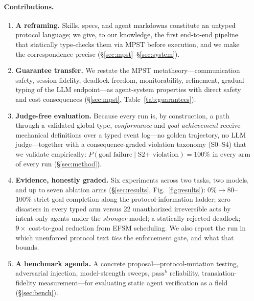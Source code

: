 \documentclass{article}
\begin{document}
\paragraph{Contributions.}
\begin{enumerate}\itemsep2pt
\item \textbf{A reframing.} Skills, specs, and agent markdowns constitute an untyped protocol language; we give, to our knowledge, the first end-to-end pipeline that statically type-checks them via MPST before execution, and we make the correspondence precise (\S\ref{sec:mpst}--\S\ref{sec:system}).
\item \textbf{Guarantee transfer.} We restate the MPST metatheory---communication safety, session fidelity, deadlock-freedom, monitorability, refinement, gradual typing of the LLM endpoint---as agent-system properties with direct safety and cost consequences (\S\ref{sec:mpst}, Table~\ref{tab:guarantees}).
\item \textbf{Judge-free evaluation.} Because every run is, by construction, a path through a validated global type, \emph{conformance} and \emph{goal achievement} receive mechanical definitions over a typed event log---no golden trajectory, no LLM judge---together with a consequence-graded violation taxonomy (S0--S4) that we validate empirically: $P(\text{goal failure}\mid\text{S2+ violation})=100\%$ in every arm of every run (\S\ref{sec:method}).
\item \textbf{Evidence, honestly graded.} Six experiments across two tasks, two models, and up to seven ablation arms (\S\ref{sec:results}, Fig.~\ref{fig:results}): 0\%$\to$80--100\% strict goal completion along the protocol-information ladder; zero disasters in every typed arm versus 22 unauthorized irreversible acts by intent-only agents under the \emph{stronger} model; a statically rejected deadlock; $9\times$ cost-to-goal reduction from EFSM scheduling. We also report the run in which unenforced protocol text \emph{ties} the enforcement gate, and what that bounds.
\item \textbf{A benchmark agenda.} A concrete proposal---protocol-mutation testing, adversarial injection, model-strength sweeps, $\mathrm{pass}^k$ reliability, translation-fidelity measurement---for evaluating static agent verification as a field (\S\ref{sec:bench}).
\end{enumerate}
\end{document}
